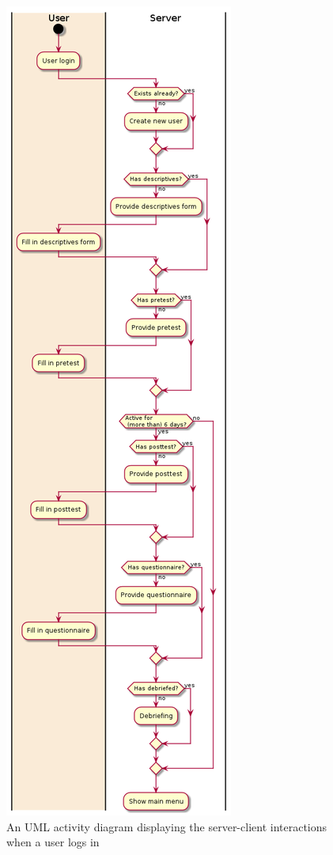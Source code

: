 \begin{figure}[h!]
\centering
\includegraphics[height=\textheight-10ex]{img/loginactivity.png}
\caption{An UML activity diagram displaying the server-client interactions when a user logs in}
\label{fig:loginactivity}
\end{figure}

